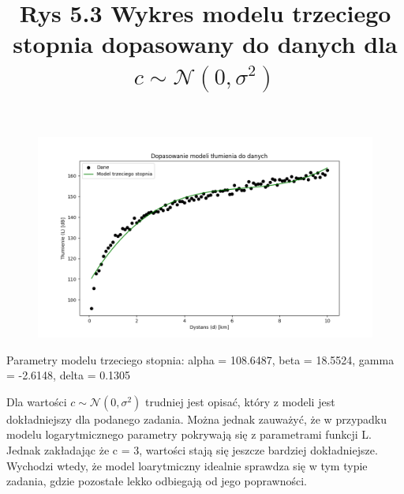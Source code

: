 \documentclass{article}
\begin{document}
\begin{figure}[h]
  \includegraphics[scale=0.4]{trzyN.png}
  \title{Rys 5.3 Wykres modelu trzeciego stopnia dopasowany do danych dla \( c \sim \mathcal{N}(0, \sigma^2) \)}
  \centering
\end{figure}
 Parametry modelu trzeciego stopnia: alpha = 108.6487, beta = 18.5524, gamma = -2.6148, delta = 0.1305

 Dla wartości \( c \sim \mathcal{N}(0, \sigma^2) \) trudniej jest opisać, który z modeli jest dokładniejszy dla podanego zadania.
 Można jednak zauważyć, że w przypadku modelu logarytmicznego parametry pokrywają się z parametrami funkcji L.
 Jednak zakładając że c = 3, wartości stają się jeszcze bardziej dokładniejsze. Wychodzi wtedy, że model loarytmiczny idealnie sprawdza się w tym typie zadania, gdzie pozostałe lekko odbiegają od jego poprawności. 
 
\end{document}

